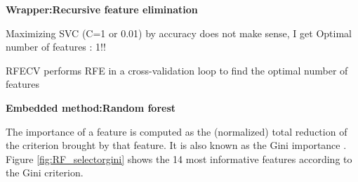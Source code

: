\documentclass[preprint,12pt]{elsarticle}
\begin{document}

\textbf{Wrapper:Recursive feature elimination}

Maximizing SVC (C=1 or 0.01) by accuracy does not make sense, I get Optimal number of features : 1!!

RFECV performs RFE in a cross-validation loop to find the optimal number of features


\textbf{Embedded method:Random forest}

The importance of a feature is computed as the (normalized) total reduction of the criterion brought by that feature. It is also known as the Gini importance \cite{breiman2017classification}.
Figure \ref{fig:RF_selectorgini} shows the 14 most informative features according to the Gini criterion.
\end{document}
